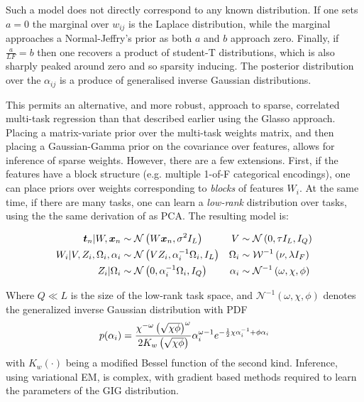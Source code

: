 Such a model does not directly correspond to any known distribution. If one sets $a=0$ the marginal over $w_{ij}$ is the Laplace distribution, while the marginal approaches a Normal-Jeffry's prior as both $a$ and $b$ approach zero. Finally, if $\frac{a}{LF} = b$ then one recovers a product of student-T distributions, which is also sharply peaked around zero and so sparsity inducing. The posterior distribution over the $\alpha_{ij}$ is a produce of generalised inverse Gaussian distributions.

This permits an alternative, and more robust,  approach to sparse, correlated multi-task regression than that described earlier using the Glasso approach. Placing a matrix-variate prior over the multi-task weights matrix, and then placing a Gaussian-Gamma prior on the covariance over features, allows for inference of sparse weights. However, there are a few extensions. First, if the features have a block structure (e.g. multiple 1-of-F categorical encodings), one can place priors over weights corresponding to \emph{blocks} of features $W_i$. At the same time, if there are many tasks, one can learn a \emph{low-rank} distribution over tasks, using the the same derivation of as PCA. The resulting model\cite{Archambeau2011} is:

\begin{align}
\bm t_n|W,\bm x_n & \sim \mathcal{N} \left( {W\bm x_n}, {\sigma^2 I_L} \right) &
V & \sim \mathcal{N} \left(0, \tau I_L, I_Q\right) \\
W_i | V, Z_i, \Omega_i,\alpha_i & \sim \mathcal{N} \left(VZ_i, \alpha_i^{-1} \Omega_i, I_L\right) &
\Omega_i & \sim \mathcal{W}^{-1}\left(\nu, \lambda I_F \right) \\
Z_i | \Omega_i & \sim \mathcal{N} \left(0, \alpha_i^{-1} \Omega_i, I_Q\right) &
\alpha_i & \sim\mathcal{N}^{-1}\left(\omega, \chi, \phi\right)
\end{align}

Where $Q \ll L$ is the size of the low-rank task space, and $\mathcal{N}^{-1}\left(\omega, \chi, \phi\right)$ denotes the generalized inverse Gaussian distribution with PDF
\begin{align}
p(\alpha_i) = \frac{\chi^{-\omega}\left(\sqrt{\chi \phi}\right)^\omega}{2 K_w \left(\sqrt{\chi \phi}\right)} \alpha_i^{\omega-1} e^{-\frac{1}{2} \chi \alpha_i^{-1} + \phi \alpha_i}
\end{align}
with $K_w(\cdot)$ being a modified Bessel function of the second kind. Inference, using variational EM, is complex, with gradient based methods required to learn the parameters of the GIG distribution.

